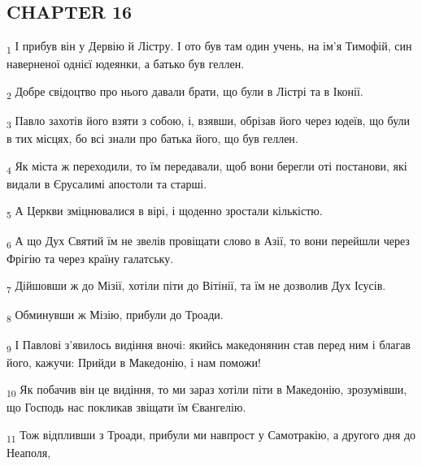 \subsection{CHAPTER 16}
\begin{tcolorbox}
\textsubscript{1} І прибув він у Дервію й Лістру. І ото був там один учень, на ім'я Тимофій, син наверненої однієї юдеянки, а батько був геллен.
\end{tcolorbox}
\begin{tcolorbox}
\textsubscript{2} Добре свідоцтво про нього давали брати, що були в Лістрі та в Іконії.
\end{tcolorbox}
\begin{tcolorbox}
\textsubscript{3} Павло захотів його взяти з собою, і, взявши, обрізав його через юдеїв, що були в тих місцях, бо всі знали про батька його, що був геллен.
\end{tcolorbox}
\begin{tcolorbox}
\textsubscript{4} Як міста ж переходили, то їм передавали, щоб вони берегли оті постанови, які видали в Єрусалимі апостоли та старші.
\end{tcolorbox}
\begin{tcolorbox}
\textsubscript{5} А Церкви зміцнювалися в вірі, і щоденно зростали кількістю.
\end{tcolorbox}
\begin{tcolorbox}
\textsubscript{6} А що Дух Святий їм не звелів провіщати слово в Азії, то вони перейшли через Фрігію та через країну галатську.
\end{tcolorbox}
\begin{tcolorbox}
\textsubscript{7} Дійшовши ж до Мізії, хотіли піти до Вітінії, та їм не дозволив Дух Ісусів.
\end{tcolorbox}
\begin{tcolorbox}
\textsubscript{8} Обминувши ж Мізію, прибули до Троади.
\end{tcolorbox}
\begin{tcolorbox}
\textsubscript{9} І Павлові з'явилось видіння вночі: якийсь македонянин став перед ним і благав його, кажучи: Прийди в Македонію, і нам поможи!
\end{tcolorbox}
\begin{tcolorbox}
\textsubscript{10} Як побачив він це видіння, то ми зараз хотіли піти в Македонію, зрозумівши, що Господь нас покликав звіщати їм Євангелію.
\end{tcolorbox}
\begin{tcolorbox}
\textsubscript{11} Тож відпливши з Троади, прибули ми навпрост у Самотракію, а другого дня до Неаполя,
\end{tcolorbox}
